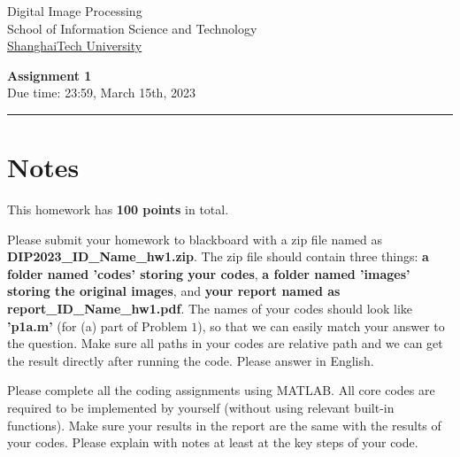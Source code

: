 \documentclass[11pt,letterpaper]{article}
\begin{document}

\usetikzlibrary{positioning}
\pagestyle{plain}
\begin{flushleft}
Digital Image Processing\\
School of Information Science and Technology\\
\underline{ShanghaiTech University}
\end{flushleft}

 
\begin{center}\vspace{-1cm}
\textbf{\large Assignment 1}\\  
Due time: 23:59,	March 15th,	2023\\
\end{center}
\rule{\linewidth}{0.1mm}

\section{Notes}
This homework has \textbf{100 points} in total. \par
Please submit your homework to blackboard with a zip file named as \textcolor[rgb]{1,0,0}{\textbf{DIP2023\_ID\_Name\_hw1.zip}}. The zip file should contain three things: \textcolor[rgb]{1,0,0}{\textbf{a folder named 'codes' storing your codes}},  \textcolor[rgb]{1,0,0}{\textbf{a folder named 'images' storing the original images}}, and \textcolor[rgb]{1,0,0}{\textbf{your report named as report\_ID\_Name\_hw1.pdf}}. The names of your codes should look like \textcolor[rgb]{1,0,0}{\textbf{'p1a.m'}} (for (a) part of Problem $1$), so that we can easily match your answer to the question. \textcolor[rgb]{1,0,0}{Make sure all paths in your codes are relative path and we can get the result directly after running the code}. Please answer in \textcolor[rgb]{1,0,0}{English}. \par

Please complete all the coding assignments using \textcolor[rgb]{1,0,0}{MATLAB}. All core codes are required to be implemented \textcolor[rgb]{1,0,0}{by yourself} (without using relevant built-in functions). Make sure your results in the report are the same with the results of your codes. Please explain with notes at least at the key steps of your code.
\end{document}
